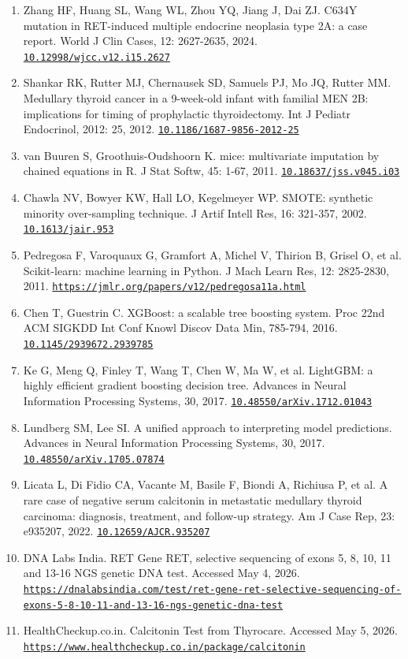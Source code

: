 \documentclass[12pt]{article}
\newcommand{\doi}[1]{\href{https://doi.org/#1}{\nolinkurl{#1}}}
\newcommand{\weblink}[1]{\href{#1}{\nolinkurl{#1}}}
\begin{document}
\begin{enumerate}
\item Zhang HF, Huang SL, Wang WL, Zhou YQ, Jiang J, Dai ZJ. C634Y mutation in RET-induced multiple endocrine neoplasia type 2A: a case report. World J Clin Cases, 12: 2627-2635, 2024. \doi{10.12998/wjcc.v12.i15.2627}
\item Shankar RK, Rutter MJ, Chernausek SD, Samuels PJ, Mo JQ, Rutter MM. Medullary thyroid cancer in a 9-week-old infant with familial MEN 2B: implications for timing of prophylactic thyroidectomy. Int J Pediatr Endocrinol, 2012: 25, 2012. \doi{10.1186/1687-9856-2012-25}
\item van Buuren S, Groothuis-Oudshoorn K. mice: multivariate imputation by chained equations in R. J Stat Softw, 45: 1-67, 2011. \doi{10.18637/jss.v045.i03}
\item Chawla NV, Bowyer KW, Hall LO, Kegelmeyer WP. SMOTE: synthetic minority over-sampling technique. J Artif Intell Res, 16: 321-357, 2002. \doi{10.1613/jair.953}
\item Pedregosa F, Varoquaux G, Gramfort A, Michel V, Thirion B, Grisel O, et al. Scikit-learn: machine learning in Python. J Mach Learn Res, 12: 2825-2830, 2011. \weblink{https://jmlr.org/papers/v12/pedregosa11a.html}
\item Chen T, Guestrin C. XGBoost: a scalable tree boosting system. Proc 22nd ACM SIGKDD Int Conf Knowl Discov Data Min, 785-794, 2016. \doi{10.1145/2939672.2939785}
\item Ke G, Meng Q, Finley T, Wang T, Chen W, Ma W, et al. LightGBM: a highly efficient gradient boosting decision tree. Advances in Neural Information Processing Systems, 30, 2017. \doi{10.48550/arXiv.1712.01043}
\item Lundberg SM, Lee SI. A unified approach to interpreting model predictions. Advances in Neural Information Processing Systems, 30, 2017. \doi{10.48550/arXiv.1705.07874}
\item Licata L, Di Fidio CA, Vacante M, Basile F, Biondi A, Richiusa P, et al. A rare case of negative serum calcitonin in metastatic medullary thyroid carcinoma: diagnosis, treatment, and follow-up strategy. Am J Case Rep, 23: e935207, 2022. \doi{10.12659/AJCR.935207}
\item DNA Labs India. RET Gene RET, selective sequencing of exons 5, 8, 10, 11 and 13-16 NGS genetic DNA test. Accessed May 4, 2026. \weblink{https://dnalabsindia.com/test/ret-gene-ret-selective-sequencing-of-exons-5-8-10-11-and-13-16-ngs-genetic-dna-test}
\item HealthCheckup.co.in. Calcitonin Test from Thyrocare. Accessed May 5, 2026. \weblink{https://www.healthcheckup.co.in/package/calcitonin}

\end{enumerate}
\end{document}
